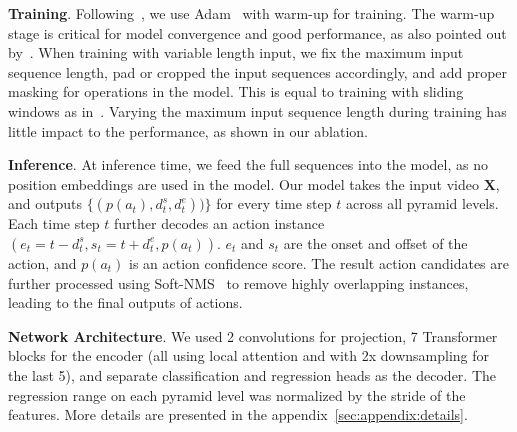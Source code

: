\smallskip
\noindent \textbf{Training}. Following~\cite{actiontransformercvpr2019}, we use Adam~\cite{kingma2014adam} with warm-up for training. The warm-up stage is critical for model convergence and good performance, as also pointed out by~\cite{liu2020understanding}. When training with variable length input, we fix the maximum input sequence length, pad or cropped the input sequences accordingly, and add proper masking for operations in the model. This is equal to training with sliding windows as in~\cite{a2nettip2020}. Varying the maximum input sequence length during training has little impact to the performance, as shown in our ablation. 

\smallskip
\noindent \textbf{Inference}. At inference time, we feed the full sequences into the model, as no position embeddings are used in the model. Our model takes the input video $\mathbf{X}$, and outputs $\{(p(a_{t}), d_{t}^s, d_{t}^e))\}$ for every time step $t$ across all pyramid levels. Each time step $t$ further decodes an action instance $(e_{t}=t-d_{t}^s, s_{t}=t+d_{t}^e, p(a_{t}))$. $e_t$ and $s_t$ are the onset and offset of the action, and $p(a_{t})$ is an action confidence score. The result action candidates are further processed using Soft-NMS~\cite{softnmsiccv2017} to remove highly overlapping instances, leading to the final outputs of actions.

\smallskip
\noindent \textbf{Network Architecture}. We used 2 convolutions for projection, 7 Transformer blocks for the encoder (all using local attention and with 2x downsampling for the last 5), and separate classification and regression heads as the decoder. The regression range on each pyramid level was normalized by the stride of the features. More details are presented in the appendix~\ref{sec:appendix:details}.






